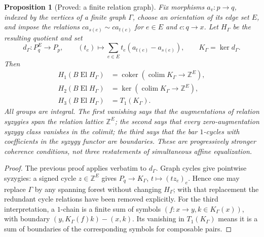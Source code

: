 \documentclass[11pt,a4paper]{article}
\newtheorem{proposition}[theorem]{Proposition}
\theoremstyle{definition}
\begin{document}
\begin{proposition}[Proved: a finite relation graph]\label{B:finite-graph}
Fix morphisms $a_v:p\to q$, indexed by the vertices of a finite graph
$\Gamma$, choose an orientation of its edge set $E$, and impose the
relations $ca_{s(e)}\sim ca_{t(e)}$ for $e\in E$ and $c:q\to x$.
Let $H_\Gamma$ be the resulting quotient and set
\[
 d_\Gamma:P_q^{E}\to P_p,\qquad
 (t_e)\longmapsto\sum_{e\in E}t_e(a_{t(e)}-a_{s(e)}),
 \qquad K_\Gamma=\ker d_\Gamma.
\]
Then
\begin{align*}
 H_1(B\operatorname{El}H_\Gamma)
 &=\operatorname{coker}(\operatorname{colim}K_\Gamma\to\mathbb Z^E),\\
 H_2(B\operatorname{El}H_\Gamma)
 &=\ker(\operatorname{colim}K_\Gamma\to\mathbb Z^E),\\
 H_3(B\operatorname{El}H_\Gamma)&=T_1(K_\Gamma).
\end{align*}
All groups are integral.  The first vanishing says that the augmentations
of relation syzygies span the relation lattice $\mathbb Z^E$; the second
says that every zero-augmentation syzygy class vanishes in the colimit;
the third says that the bar $1$-cycles with coefficients in the syzygy
functor are boundaries.  These are progressively stronger coherence
conditions, not three restatements of simultaneous affine equalization.
\end{proposition}
\begin{proof}
The previous proof applies verbatim to $d_\Gamma$.  Graph cycles give
pointwise syzygies: a signed cycle $z\in\mathbb Z^E$ gives
$P_q\to K_\Gamma$, $t\mapsto(tz_e)_e$.  Hence one may replace
$\Gamma$ by any spanning forest without changing $H_\Gamma$; with that
replacement the redundant cycle relations have been removed explicitly.
For the third interpretation, a $1$-chain is a finite sum of symbols
$(f:x\to y,k\in K_\Gamma(x))$, with boundary
$(y,K_\Gamma(f)k)-(x,k)$.  Its vanishing in $T_1(K_\Gamma)$ means it is a
sum of boundaries of the corresponding symbols for composable pairs.
\end{proof}
\end{document}
